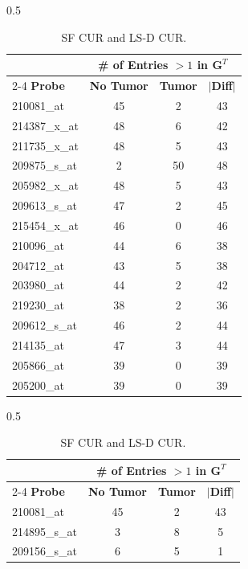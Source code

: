 \documentclass[12pt]{article}
\begin{document}
\begin{table}[H]
    \begin{subtable}{0.5\linewidth}
    \centering
    \small
    \begin{tabular}{|l|c|c|c|}
        \hline
        & \multicolumn{3}{c|}{\textbf{\# of Entries $>1$ in $\mathbf{G}^T$}} \\ 
        \cline{2-4}
         \textbf{Probe} & \textbf{No Tumor} & \textbf{Tumor} & $|$\textbf{Diff}$|$ \\
        \hline
        210081\_at & 45 & 2 & 43 \\
        214387\_x\_at & 48 & 6 & 42 \\
        211735\_x\_at & 48 & 5 & 43 \\
        209875\_s\_at & 2 & 50 & 48 \\
        205982\_x\_at & 48 & 5 & 43 \\
        209613\_s\_at & 47 & 2 & 45 \\
        215454\_x\_at & 46 & 0 & 46 \\
        210096\_at & 44 & 6 & 38 \\
        204712\_at & 43 & 5 & 38 \\
        203980\_at & 44 & 2 & 42 \\
        219230\_at & 38 & 2 & 36 \\
        209612\_s\_at & 46 & 2 & 44 \\
        214135\_at & 47 & 3 & 44 \\
        205866\_at & 39 & 0 & 39 \\
        205200\_at & 39 & 0 & 39 \\
        \hline
    \end{tabular}
    \caption{SF CUR and LS-D CUR.}
\end{subtable}%
    \begin{subtable}{0.5\linewidth}
    \centering
    \small
    \begin{tabular}{|l|c|c|c|}
        \hline
        & \multicolumn{3}{c|}{\textbf{\# of Entries $>1$ in $\mathbf{G}^T$}} \\ 
        \cline{2-4}
         \textbf{Probe} & \textbf{No Tumor} & \textbf{Tumor} & $|$\textbf{Diff}$|$ \\
        \hline
        210081\_at & 45 & 2 & 43 \\
        214895\_s\_at & 3 & 8 & 5 \\
        209156\_s\_at & 6 & 5 & 1 \\

\end{tabular}
\end{subtable}
\end{table}
\end{document}
